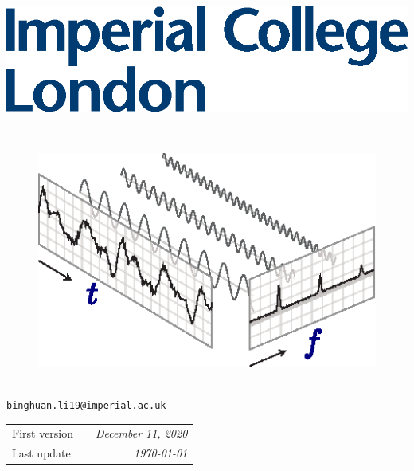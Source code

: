 \begin{titlepage}
\Large

\begin{minipage}{0.4\textwidth}
    \includegraphics[width=\textwidth]{images/Imperial.eps}
\end{minipage}

\vspace{1cm}

\begin{center}
        \vspace{2cm}
        {\Huge \textbf{\textit{\doc}}}\\
        \vspace{1cm}
        \begin{figure}[H]
            \centering
            \includegraphics[width=.8\textwidth]{images/fourierT.eps}
        \end{figure}
        \vspace{1.5cm}
        \textit{\textbf{\docAuthor}}\\
        {\large\href{mailto:binghuan.li19@imperial.ac.uk}{\texttt{binghuan.li19@imperial.ac.uk}}}

        \vspace{2.5cm}
        {\centering \large
        \begin{tabular}{lcr}
            First version && \textit{December 11, 2020} \\
            Last update && \textit{\today}
        \end{tabular}}
        \vfill
\end{center}

\end{titlepage}
